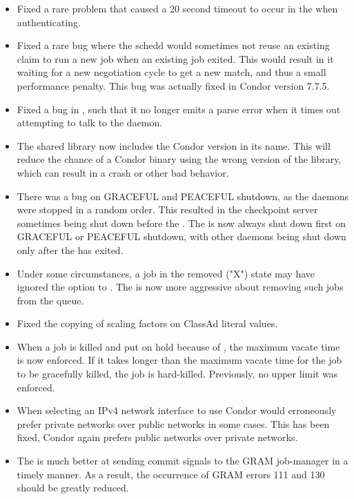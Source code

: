 \begin{itemize}

\item Fixed a rare problem that caused a 20 second timeout to occur in
the  when authenticating.

\item Fixed a rare bug where the schedd would sometimes not reuse
an existing claim to run a new job when an existing job exited.  This
would result in it waiting for a new negotiation cycle to get a new match,
and thus a small performance penalty.  This bug was actually fixed
in Condor version 7.7.5.

\item Fixed a bug in , such that it no longer emits a parse
error when it times out attempting to talk to the  daemon.

\item The shared library  now includes the Condor
version in its name. This will reduce the chance of a Condor binary
using the wrong version of the library, which can result in a crash or
other bad behavior.

\item There was a bug on GRACEFUL and PEACEFUL shutdown, 
as the daemons were stopped in a random order. 
This resulted in the checkpoint server 
sometimes being shut down before the .  
The  is now always shut down first on GRACEFUL or PEACEFUL 
shutdown, 
with other daemons being shut down only after the  has exited.

\item Under some circumstances, 
a job in the removed ("X") state may have ignored the  option 
to .
The  is now more aggressive about removing such jobs 
from the queue.

\item Fixed the copying of scaling factors on ClassAd literal values.

\item When a job is killed and put on hold because of
  , the maximum vacate time is now enforced.  If
  it takes longer than the maximum vacate time for the job to be
  gracefully killed, the job is hard-killed.  Previously, no upper
  limit was enforced.

\item When selecting an IPv4 network interface to use Condor would erroneously prefer private networks over public networks in some cases.  This has been fixed, Condor again prefers public networks over private networks.

\item The  is much better at sending commit signals
to the GRAM job-manager in a timely manner. As a result, the occurrence of
GRAM errors 111 and 130 should be greatly reduced.

\end{itemize}

